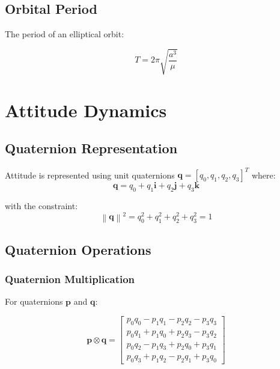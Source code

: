 \documentclass[11pt,a4paper]{article}
\newcommand{\vect}[1]{\bm{#1}}
\newcommand{\quat}[1]{\mathbf{#1}}
\newcommand{\norm}[1]{\left\lVert #1 \right\rVert}
\begin{document}
\subsection{Orbital Period}

The period of an elliptical orbit:

\begin{equation}
    T = 2\pi \sqrt{\frac{a^3}{\mu}}
\end{equation}

\section{Attitude Dynamics}

\subsection{Quaternion Representation}

Attitude is represented using unit quaternions $\quat{q} = [q_0, q_1, q_2, q_3]^T$ where:
\begin{equation}
    \quat{q} = q_0 + q_1 \vect{i} + q_2 \vect{j} + q_3 \vect{k}
\end{equation}

with the constraint:
\begin{equation}
    \norm{\quat{q}}^2 = q_0^2 + q_1^2 + q_2^2 + q_3^2 = 1
\end{equation}

\subsection{Quaternion Operations}

\subsubsection{Quaternion Multiplication}

For quaternions $\quat{p}$ and $\quat{q}$:

\begin{equation}
    \quat{p} \otimes \quat{q} =
    \begin{bmatrix}
        p_0 q_0 - p_1 q_1 - p_2 q_2 - p_3 q_3 \\
        p_0 q_1 + p_1 q_0 + p_2 q_3 - p_3 q_2 \\
        p_0 q_2 - p_1 q_3 + p_2 q_0 + p_3 q_1 \\
        p_0 q_3 + p_1 q_2 - p_2 q_1 + p_3 q_0
    \end{bmatrix}
\end{equation}
\end{document}
